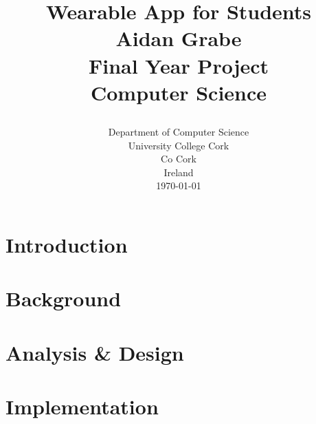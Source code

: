 \documentclass[12pt]{report}
\title{
    {\huge Wearable App for Students}\\
    {\textbf{Aidan Grabe}}\\
    {\vspace{12px}}
    {Final Year Project}\\
    {Computer Science}\\
    {\vspace{12px}}
    {\begin{figure}}
        \texttt{[image: ucc\_logo.jpg]}
    {\end{figure}}
}
\author {}
\date {
    {Department of Computer Science}\\
    {University College Cork}\\
    {Co Cork}\\
    {Ireland}\\
    {\today}
}
\begin{document}
\maketitle



\chapter{Introduction}


\chapter{Background}


\chapter{Analysis \& Design}


\chapter{Implementation}

\end{document}
